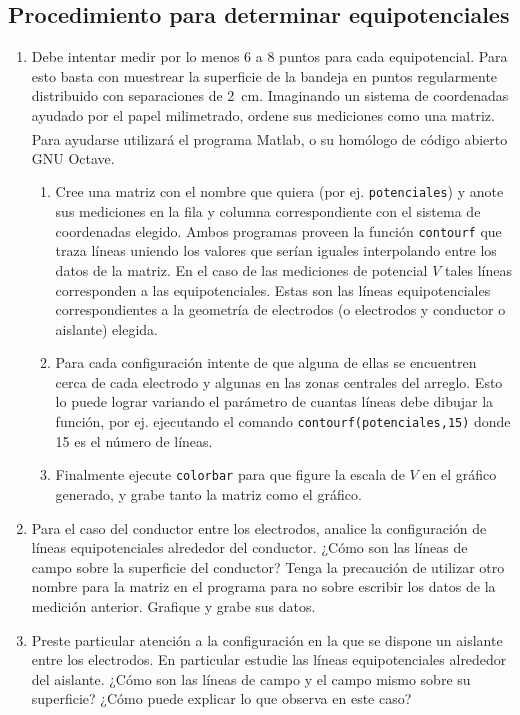 \documentclass[laboratorio]{guia}
\begin{document}
\subsection{Procedimiento para determinar equipotenciales}
\begin{enumerate}
  \item Debe intentar medir por lo menos 6 a 8 puntos para cada equipotencial.
  Para esto basta con muestrear la superficie de la bandeja en puntos regularmente distribuido con separaciones de \SI{2}{\centi\metre}.
  Imaginando un sistema de coordenadas ayudado por el papel milimetrado, ordene sus mediciones como una matriz.
    Para ayudarse utilizará el programa Matlab\textsuperscript{\textregistered}, o su homólogo de código abierto GNU Octave.
	\begin{enumerate}
      \item Cree una matriz con el nombre que quiera (por ej. \verb'potenciales') y anote sus mediciones en la fila y columna correspondiente con el sistema de coordenadas elegido.
    Ambos programas proveen la función \verb'contourf' que traza líneas uniendo los valores que serían iguales interpolando entre los datos de la matriz.
      En el caso de las mediciones de potencial \(V\) tales líneas corresponden a las equipotenciales.
    Estas son las líneas equipotenciales correspondientes a la geometría de electrodos (o electrodos y conductor o aislante) elegida.
	  \item Para cada configuración intente de que alguna de ellas se encuentren cerca de cada electrodo y algunas en las zonas centrales del arreglo.
    Esto lo puede lograr variando el parámetro de cuantas líneas debe dibujar la función, por ej. ejecutando el comando \verb'contourf(potenciales,15)' donde \num{15} es el número de líneas.
      \item Finalmente ejecute \verb'colorbar' para que figure la escala de \(V\) en el gráfico generado, y grabe tanto la matriz como el gráfico.
	\end{enumerate}
  \item Para el caso del conductor entre los electrodos, analice la configuración de líneas equipotenciales alrededor del conductor.
        ¿Cómo son las líneas de campo sobre la superficie del conductor?
    Tenga la precaución de utilizar otro nombre para la matriz en el programa para no sobre escribir los datos de la medición anterior.
    Grafique y grabe sus datos.
  \item Preste particular atención a la configuración en la que se
        dispone un aislante entre los electrodos. En particular estudie las
        líneas equipotenciales alrededor del aislante. ¿Cómo son las
        líneas de campo y el campo mismo sobre su superficie? ¿Cómo
        puede explicar lo que observa en este caso?
\end{enumerate}


\nocite{Alonso1998,Purcell1988,Reitz1996,Trelles1984}
 

\end{document}
